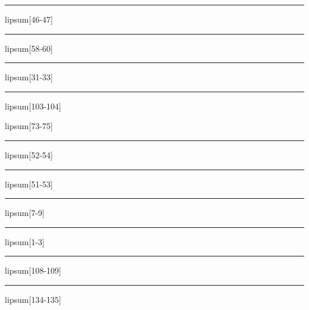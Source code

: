 \documentclass[11pt,a4paper]{article}
\begin{document}
\begin{simplewrap}
  \textcolor{red!25}{\rule{3.1cm}{4.9cm}}
\end{simplewrap}
lipsum[46-47]

\begin{simplewrap}
  \textcolor{blue!45}{\rule{5.4cm}{7.7cm}}
\end{simplewrap}
lipsum[58-60]

\begin{simplewrap}
  \textcolor{olive!56}{\rule{4.0cm}{8.6cm}}
\end{simplewrap}
lipsum[31-33]

\begin{simplewrap}
  \textcolor{blue!21}{\rule{3.7cm}{6.1cm}}
\end{simplewrap}
lipsum[103-104]

lipsum[73-75]

\begin{simplewrap}
  \textcolor{violet!30}{\rule{3.3cm}{5.7cm}}
\end{simplewrap}
lipsum[52-54]

\begin{simplewrap}
  \textcolor{violet!57}{\rule{4.9cm}{5.7cm}}
\end{simplewrap}
lipsum[51-53]

\begin{simplewrap}
  \textcolor{magenta!58}{\rule{5.4cm}{3.2cm}}
\end{simplewrap}
lipsum[7-9]

\begin{simplewrap}
  \textcolor{lime!50}{\rule{5.5cm}{9.0cm}}
\end{simplewrap}
lipsum[1-3]

\begin{simplewrap}
  \textcolor{pink!57}{\rule{5.2cm}{2.8cm}}
\end{simplewrap}
lipsum[108-109]

\begin{simplewrap}
  \textcolor{blue!19}{\rule{5.1cm}{2.7cm}}
\end{simplewrap}
lipsum[134-135]
\end{document}
